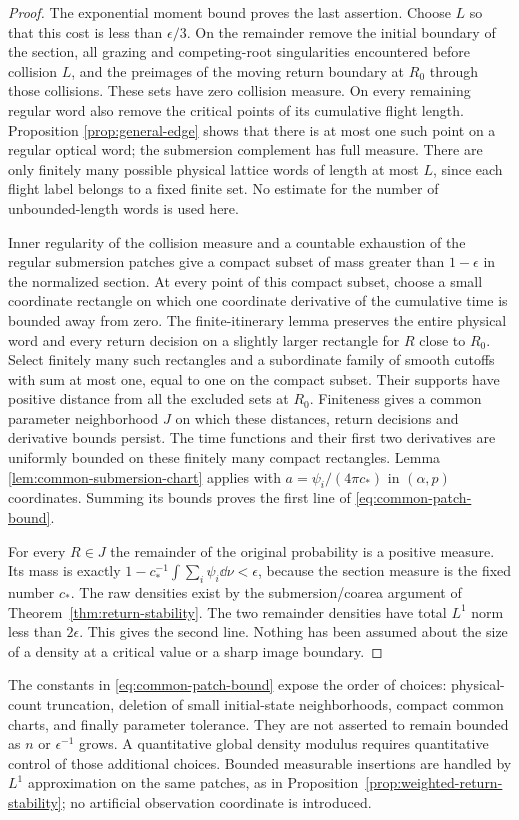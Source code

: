 \begin{proof}
The exponential moment bound proves the last assertion. Choose $L$ so
that this cost is less than $\epsilon/3$. On the remainder remove the
initial boundary of the section, all grazing and competing-root
singularities encountered before collision $L$, and the preimages of the
moving return boundary at $R_0$ through those collisions. These sets have
zero collision measure. On every remaining regular word also remove the
critical points of its cumulative flight length. Proposition
\ref{prop:general-edge} shows that there is at most one such point on a
regular optical word; the submersion complement has full measure.
There are only finitely many possible physical lattice words of length
at most $L$, since each flight label belongs to a fixed finite set.
No estimate for the number of unbounded-length words is used here.

Inner regularity of the collision measure and a countable exhaustion of
the regular submersion patches give a compact subset of mass greater
than $1-\epsilon$ in the normalized section. At every point of this
compact subset, choose a small coordinate rectangle on which one
coordinate derivative of the cumulative time is bounded away from zero.
The finite-itinerary lemma preserves the entire physical word and every
return decision on a slightly larger rectangle for $R$ close to $R_0$.
Select finitely many such rectangles and a subordinate family of smooth
cutoffs with sum at most one, equal to one on the compact subset.
Their supports have positive distance from all the excluded sets at
$R_0$. Finiteness gives a common parameter neighborhood $J$ on which
these distances, return decisions and derivative bounds persist. The
time functions and their first two derivatives are uniformly bounded
on these finitely many compact rectangles. Lemma
\ref{lem:common-submersion-chart} applies with
$a=\psi_i/(4\pi c_*)$ in $(\alpha,p)$ coordinates. Summing its bounds
proves the first line of \eqref{eq:common-patch-bound}.

For every $R\in J$ the remainder of the original probability is a
positive measure. Its mass is exactly
$1-c_*^{-1}\int\sum_i\psi_i\dd\nu<\epsilon$, because the section
measure is the fixed number $c_*$. The raw densities exist by the
submersion/coarea argument of Theorem~\ref{thm:return-stability}.
The two remainder densities have total $L^1$ norm less than
$2\epsilon$. This gives the second line. Nothing has been assumed about
the size of a density at a critical value or a sharp image boundary.
\end{proof}

The constants in \eqref{eq:common-patch-bound} expose the order of
choices: physical-count truncation, deletion of small initial-state
neighborhoods, compact common charts, and finally parameter tolerance.
They are not asserted to remain bounded as $n$ or $\epsilon^{-1}$ grows.
A quantitative global density modulus requires quantitative control of
those additional choices. Bounded measurable insertions are handled by
$L^1$ approximation on the same patches, as in
Proposition~\ref{prop:weighted-return-stability}; no artificial observation
coordinate is introduced.
